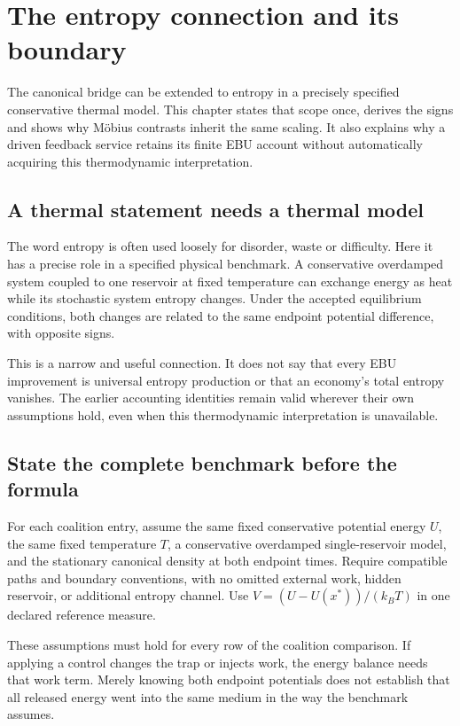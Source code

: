 \chapter{The entropy connection and its boundary}\label{ch:entropy}

The canonical bridge can be extended to entropy in a precisely specified conservative thermal model. This chapter states that scope once, derives the signs and shows why Möbius contrasts inherit the same scaling. It also explains why a driven feedback service retains its finite EBU account without automatically acquiring this thermodynamic interpretation.


\section{A thermal statement needs a thermal model}
The word entropy is often used loosely for disorder, waste or difficulty. Here it has a precise role in a specified physical benchmark. A conservative overdamped system coupled to one reservoir at fixed temperature can exchange energy as heat while its stochastic system entropy changes. Under the accepted equilibrium conditions, both changes are related to the same endpoint potential difference, with opposite signs.

This is a narrow and useful connection. It does not say that every EBU improvement is universal entropy production or that an economy's total entropy vanishes. The earlier accounting identities remain valid wherever their own assumptions hold, even when this thermodynamic interpretation is unavailable.

\section{State the complete benchmark before the formula}
For each coalition entry, assume the same fixed conservative potential energy $U$, the same fixed temperature $T$, a conservative overdamped single-reservoir model, and the stationary canonical density at both endpoint times. Require compatible paths and boundary conventions, with no omitted external work, hidden reservoir, or additional entropy channel. Use $V=(U-U(x^*))/(k_BT)$ in one declared reference measure.

These assumptions must hold for every row of the coalition comparison. If applying a control changes the trap or injects work, the energy balance needs that work term. Merely knowing both endpoint potentials does not establish that all released energy went into the same medium in the way the benchmark assumes.

